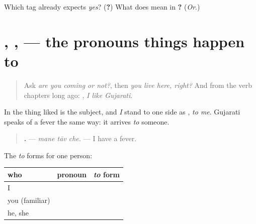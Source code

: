 \begin{tcolorbox}[breakable,colback=teal!4,colframe=teal!35!black,title={Before you move on}]
Which tag already expects \emph{yes}? (\textbf{?}) What does \textbf{} mean in \textbf{ ?} (\emph{Or}.)
\end{tcolorbox}
\section[\texorpdfstring{\gu{મને} · \gu{તને} · \gu{તેને} (mane · tane · tene)}{મને · તને · તેને (mane · tane · tene)}]{, ,  — the pronouns things happen to}

\label{lesson:GU-C146-mane}



\begin{quote}
Ask \emph{are you coming or not?}, then \emph{you live here, right?} And from the verb chapters long ago: \textbf{   }, \emph{I like Gujarati}.
\end{quote}

\begin{grammarlens}[title={Grammar Lens: the person something happens to}]
In \textbf{   } the thing liked is the subject, and \emph{I} stand to one side as \textbf{}, \emph{to me}. Gujarati speaks of a fever the same way: it arrives \emph{to} someone.

\begin{quote}
\textbf{  .} — \emph{mane tāv che.} — I have a fever.
\end{quote}

The \emph{to} forms for one person:

\noindent
\begin{tabularx}{\linewidth}{@{}>{\raggedright\arraybackslash}X>{\raggedright\arraybackslash}X>{\raggedright\arraybackslash}X@{}}
\toprule
\textbf{who} & \textbf{pronoun} & \textbf{\emph{to} form} \\
\midrule
I & \gu{હું} & \gu{મને} \\
you (familiar) & \gu{તું} & \gu{તને} \\
he, she & \gu{તે} & \gu{તેને} \\
\bottomrule
\end{tabularx}
\end{grammarlens}

